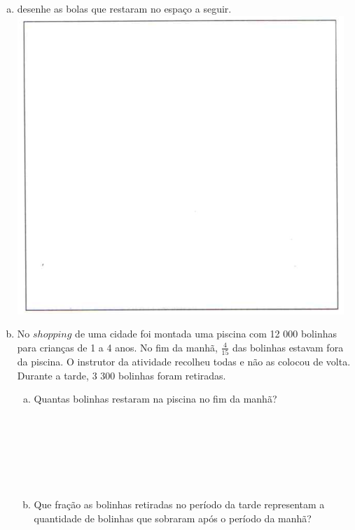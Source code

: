 \documentclass[a4paper,14pt]{article}
\begin{document}
\begin{multicols}{2}
\begin{enumerate}
\begin{enumerate}[a)]
				\item desenhe as bolas que restaram no espaço a seguir. \\
				\includegraphics[width=1\linewidth]{6FMA10_imagens/imagem1}
				\item No $shopping$ de uma cidade foi montada uma piscina com 12 000 bolinhas para crianças de 1 a 4 anos. No fim da manhã, $\frac{4}{15}$ das bolinhas estavam fora da piscina. O instrutor da atividade recolheu todas e não as colocou de volta. Durante a tarde, 3 300 bolinhas foram retiradas.
				\begin{enumerate}[a)]
					\item Quantas bolinhas restaram na piscina no fim da manhã? \\\\\\\\\\\\\\
					\item Que fração as bolinhas retiradas no período da tarde representam a quantidade de bolinhas que sobraram após o período da manhã? \\\\\\\\
				\end{enumerate}
			\end{enumerate}
		\end{enumerate}
	\end{multicols}
\end{document}
